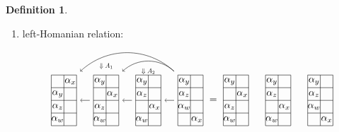 \documentclass[11pt, reqno]{amsart} %
\newcommand{\strsquare}[4][]{
  \begin{scope}[every node/.append style={overlay},#1]
    \foreach \x [count=\i] in {#4}{
      \ifx\x\empty
      \else
        \pgfmathsetmacro{\modResult}{mod(\i-1, #2)}
        \pgfmathsetmacro{\quotResult}{(\i-\modResult-1)/#2}
        \node at (\modResult,-\quotResult) {\x};
      \fi
    }
    \foreach \x in {0,1,...,#2}{
      \draw ({-1/2+\x},{1/2})--({-1/2+\x},{-#3+1/2});
    }
    \foreach \y in {0,1,...,#3}{
      \draw ({-1/2},{1/2-\y})--({#2-1/2},{1/2-\y});
    }
  \end{scope}
}
\theoremstyle{definition}
\newtheorem{definition}[theorem]{Definition}
\theoremstyle{remark}
\numberwithin{equation}{section}
\begin{document}
\begin{definition}
\begin{enumerate}
\begin{align}
    \nonumber
    \{\beta',\beta|\alpha\#_1f\} &= \{\beta',\beta|\alpha\}\#_1f, & 
    \{\beta'|\alpha'\#_1f,\alpha\#_1f\} &= \{\beta'|\alpha',\alpha\}\#_1f,
  \end{align}
  \begin{align}
    \nonumber
    \{f\#_1\Psi,\alpha\}_{32} &= f\#_1\{\Psi,\alpha\}_{32}, &
    \{f\#_1\beta,\Phi\}_{23} &= f\#_1\{\beta,\Phi\}_{23}, \\
    \nonumber
    \{\Psi\#_1f,\alpha\}_{32} &= \{\Psi,f\#_1\alpha\}_{32}, &
    \{\beta\#_1f,\Phi\}_{23} &= \{\beta,f\#_1\Phi\}_{23} \\
    \nonumber
    \{\Psi,\alpha\#_1f\}_{32} &= \{\Psi,\alpha\}_{32}\#_1f, &
    \{\beta,\Phi\#_1f\}_{23} &= \{\beta,\Phi\}_{23}\#_1f,
  \end{align}
  where sources and targets are assumed to be compatible.
  \item \label{ax:Gray4-HomanRels}left-Homanian relation: 
  \[
    \begin{tikzpicture}[baseline=-2pt]
      \node (P) at (9/4,0) {\tikz[scale=0.45]{\strsquare{2}{4}{$\alpha_y$,,$\alpha_z$,,$\alpha_w$,,,$\alpha_x$}}};
      \node (Q) at (3/4,0) {\tikz[scale=0.45]{\strsquare{2}{4}{$\alpha_y$,,$\alpha_z$,,,$\alpha_x$,$\alpha_w$,}}};
      \node (R) at (-3/4,0) {\tikz[scale=0.45]{\strsquare{2}{4}{$\alpha_y$,,,$\alpha_x$,$\alpha_z$,,$\alpha_w$,}}};
      \node (S) at (-9/4,0) {\tikz[scale=0.45]{\strsquare{2}{4}{,$\alpha_x$,$\alpha_y$,,$\alpha_z$,,$\alpha_w$,}}};
      \draw [->] (P) to (Q);
      \draw [->] (Q) to (R);
      \draw [->] (R) to (S);
      \draw [->,bend right=1.5cm] (P.north west) to (R.north east);
      \draw [->,bend right=1.5cm] (P.north west) to (S.north east);
      \node at (R.north) [anchor=south,transform shape,scale=.66] {$\Downarrow A_1$};
      \node at (Q.north) [transform shape,scale=.66] {$\Downarrow A_2$};
    \end{tikzpicture}
    =
    \begin{tikzpicture}[baseline=-2pt]
      \node (P) at (9/4,0) {\tikz[scale=0.45]{\strsquare{2}{4}{$\alpha_y$,,$\alpha_z$,,$\alpha_w$,,,$\alpha_x$}}};
      \node (Q) at (3/4,0) {\tikz[scale=0.45]{\strsquare{2}{4}{$\alpha_y$,,$\alpha_z$,,,$\alpha_x$,$\alpha_w$,}}};
      \node (R) at (-3/4,0) {\tikz[scale=0.45]{\strsquare{2}{4}{$\alpha_y$,,,$\alpha_x$,$\alpha_z$,,$\alpha_w$,}}};

\end{tikzpicture}\]
\end{enumerate}
\end{definition}
\end{document}
